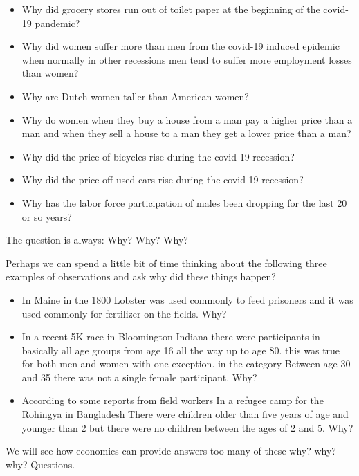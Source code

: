 \documentclass[
]{book}
\providecommand{\tightlist}{%
  \setlength{\itemsep}{0pt}\setlength{\parskip}{0pt}}
\begin{document}
\begin{itemize}
\tightlist
\item
  Why did grocery stores run out of toilet paper at the beginning of the covid-19 pandemic?
\item
  Why did women suffer more than men from the covid-19 induced epidemic when normally in other recessions men tend to suffer more employment losses than women?\\
\item
  Why are Dutch women taller than American women?
\item
  Why do women when they buy a house from a man pay a higher price than a man and when they sell a house to a man they get a lower price than a man?
\item
  Why did the price of bicycles rise during the covid-19 recession?
\item
  Why did the price off used cars rise during the covid-19 recession?
\item
  Why has the labor force participation of males been dropping for the last 20 or so years?
\end{itemize}

The question is always:
Why? Why? Why?

Perhaps we can spend a little bit of time thinking about the following three examples of observations and ask why did these things happen?

\begin{itemize}
\tightlist
\item
  In Maine in the 1800 Lobster was used commonly to feed prisoners and it was used commonly for fertilizer on the fields. Why?\\
\item
  In a recent 5K race in Bloomington Indiana there were participants in basically all age groups from age 16 all the way up to age 80. this was true for both men and women with one exception. in the category Between age 30 and 35 there was not a single female participant. Why?\\
\item
  According to some reports from field workers In a refugee camp for the Rohingya in Bangladesh There were children older than five years of age and younger than 2 but there were no children between the ages of 2 and 5. Why?
\end{itemize}

We will see how economics can provide answers too many of these why? why? why? Questions.
\end{document}
